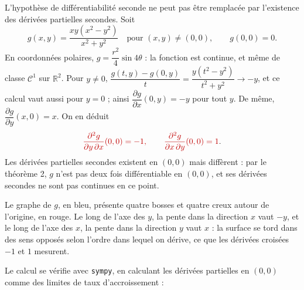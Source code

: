 \documentclass[a4paper,twoside]{report}
\newcommand{\rmath}[1]{\textcolor{rougecours}{#1}}
\newcommand{\R}{\mathbb{R}}
\newcommand{\Cc}{\mathcal{C}}                     %
\newcommand{\dpd}[2]{\dfrac{\partial #1}{\partial #2}}  %
\begin{document}
L'hypothèse de différentiabilité seconde ne peut pas être remplacée par l'existence des dérivées partielles secondes. Soit
\[ g(x, y) = \frac{xy(x^{2} - y^{2})}{x^{2} + y^{2}} \quad \text{pour } (x, y) \neq (0, 0), \qquad g(0, 0) = 0. \]
En coordonnées polaires, $g = \dfrac{r^{2}}{4}\sin 4\theta$ : la fonction est continue, et même de classe $\Cc^{1}$ sur $\R^{2}$. Pour $y \neq 0$, $\dfrac{g(t, y) - g(0, y)}{t} = \dfrac{y(t^{2} - y^{2})}{t^{2} + y^{2}} \to -y$, et ce calcul vaut aussi pour $y = 0$ ; ainsi $\dpd{g}{x}(0, y) = -y$ pour tout $y$. De même, $\dpd{g}{y}(x, 0) = x$. On en déduit
\[ \rmath{\frac{\partial^{2} g}{\partial y\,\partial x}(0, 0) = -1, \qquad \frac{\partial^{2} g}{\partial x\,\partial y}(0, 0) = 1}. \]
Les dérivées partielles secondes existent en $(0, 0)$ mais diffèrent : par le théorème 2, $g$ n'est pas deux fois différentiable en $(0, 0)$, et ses dérivées secondes ne sont pas continues en ce point.

\begin{center}
\end{center}

\noindent Le graphe de $g$, en bleu, présente quatre bosses et quatre creux autour de l'origine, en rouge. Le long de l'axe des $y$, la pente dans la direction $x$ vaut $-y$, et le long de l'axe des $x$, la pente dans la direction $y$ vaut $x$ : la surface se tord dans des sens opposés selon l'ordre dans lequel on dérive, ce que les dérivées croisées $-1$ et $1$ mesurent.

\noindent Le calcul se vérifie avec \texttt{sympy}, en calculant les dérivées partielles en $(0, 0)$ comme des limites de taux d'accroissement :
\end{document}
